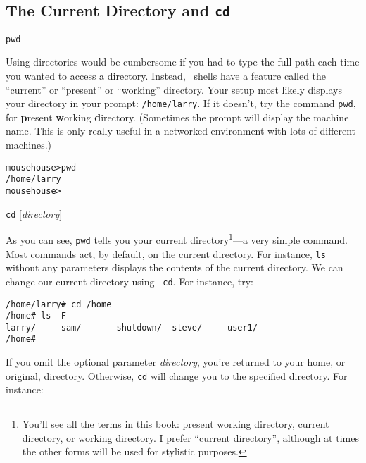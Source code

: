 \subsection{The Current Directory and {\tt cd}}

\begin{command}
{\tt pwd}
\end{command}

Using directories would be cumbersome if you had to type the full path
each time you wanted to access a directory.  Instead, \unix\ shells
have a feature called the ``current'' or ``present'' or ``working''
directory.  Your setup most likely displays your directory in your
prompt: {\tt /home/larry}. If it doesn't, try the command {\tt pwd},
for {\bf p}resent {\bf w}orking {\bf d}irectory.  (Sometimes the
prompt will display the machine name.  This is only really useful in a
networked environment with lots of different machines.)

\begin{screen}\begin{verbatim}
mousehouse>pwd
/home/larry
mousehouse>  
\end{verbatim}
\end{screen}

\begin{command}
{\tt cd} [{\sl directory}]
\end{command}

As you can see, {\tt pwd} tells you your current
directory\footnote{You'll see all the terms in this book: present
  working directory, current directory, or working directory.  I
  prefer ``current directory'', although at times the other forms will
  be used for stylistic purposes.}---a very simple command.  Most
commands act, by default, on the current directory.  For instance,
{\tt ls} without any parameters displays the contents of the current
directory.  We can change our current directory using {\tt
  cd}. For instance, try:

\begin{screen}\begin{verbatim}
/home/larry# cd /home
/home# ls -F
larry/     sam/       shutdown/  steve/     user1/
/home# 
\end{verbatim}
\end{screen}

If you omit the optional parameter {\sl directory}, you're returned to
your home, or original, directory.  Otherwise, {\tt cd} will change
you to the specified directory. For instance:

